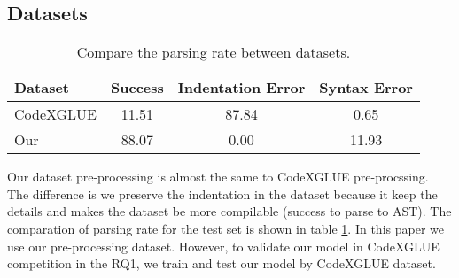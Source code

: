 \subsection{Datasets}

\begin{table}[]
    \centering
    \begin{tabular}{l|c|c|c}
        Dataset & Success & Indentation Error & Syntax Error \\
        \hline
        CodeXGLUE & 11.51 & 87.84 & 0.65 \\ 
        Our & 88.07 & 0.00 & 11.93 \\
    \end{tabular}
    \caption{Compare the parsing rate between datasets.}
    \label{tab:parsing rate}
\end{table}

Our dataset pre-processing is almost the same to CodeXGLUE pre-procssing. The difference is we preserve the indentation in the dataset because it keep the details and makes the dataset be more compilable (success to parse to AST). The comparation of parsing rate  for the test set is shown in table \ref{tab:parsing rate}. In this paper we use our pre-processing dataset. However, to validate our model in CodeXGLUE competition in the RQ1, we train and test our model by CodeXGLUE dataset. 

